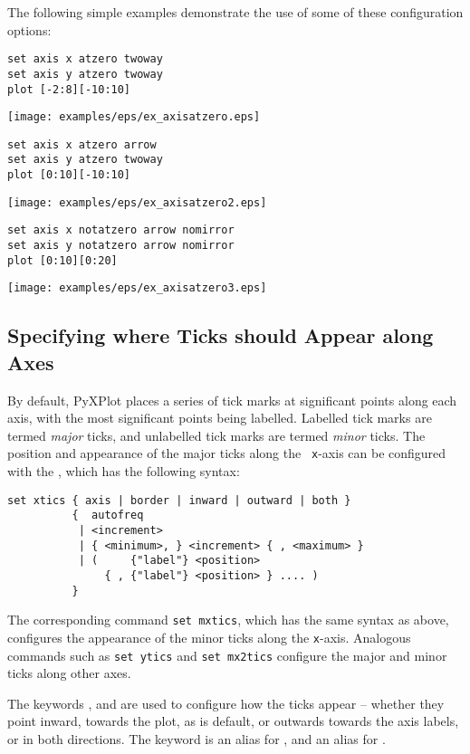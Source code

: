 The following simple examples demonstrate the use of some of these configuration options:
\begin{verbatim}
set axis x atzero twoway
set axis y atzero twoway
plot [-2:8][-10:10]
\end{verbatim}

\centerline{\texttt{[image: examples/eps/ex\_axisatzero.eps]}}

\begin{verbatim}
set axis x atzero arrow
set axis y atzero twoway
plot [0:10][-10:10]
\end{verbatim}

\centerline{\texttt{[image: examples/eps/ex\_axisatzero2.eps]}}

\begin{verbatim}
set axis x notatzero arrow nomirror
set axis y notatzero arrow nomirror
plot [0:10][0:20]
\end{verbatim}

\centerline{\texttt{[image: examples/eps/ex\_axisatzero3.eps]}}

\subsection{Specifying where Ticks should Appear along Axes}

By default, PyXPlot places a series of tick marks at significant points along
each axis, with the most significant points being labelled.  Labelled tick
marks are termed {\it major} ticks, and unlabelled tick marks are termed {\it
minor} ticks.  The position and appearance of the major ticks along the {\tt
x}-axis can be configured with the , which has the following
syntax:

\begin{verbatim}
set xtics { axis | border | inward | outward | both }
          {  autofreq
           | <increment>
           | { <minimum>, } <increment> { , <maximum> }
           | (     {"label"} <position>
               { , {"label"} <position> } .... )
          }
\end{verbatim}

The corresponding command {\tt set mxtics}, which has the same syntax as above,
configures the appearance of the minor ticks along the {\tt x}-axis. Analogous
commands such as {\tt set ytics} and {\tt set mx2tics} configure the major and
minor ticks along other axes.

The keywords ,  and  are used to
configure how the ticks appear -- whether they point inward, towards the plot,
as is default, or outwards towards the axis labels, or in both directions.  The
keyword  is an alias for , and 
an alias for .

